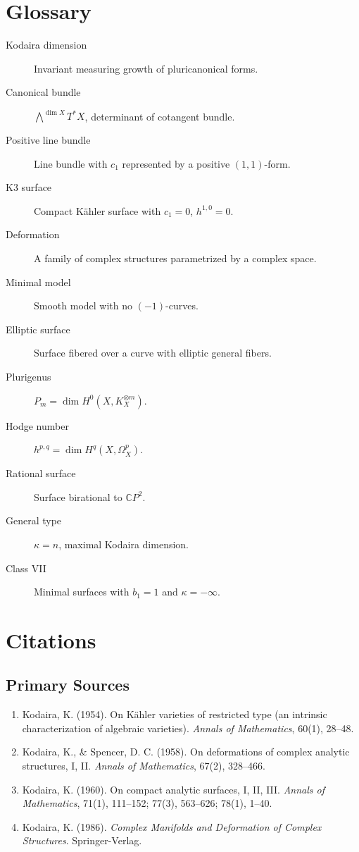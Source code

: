 \section*{Glossary}
\begin{description}
    \item[Kodaira dimension] Invariant measuring growth of pluricanonical forms.
    \item[Canonical bundle] $\bigwedge^{\dim X} T^*X$, determinant of cotangent bundle.
    \item[Positive line bundle] Line bundle with $c_1$ represented by a positive $(1,1)$-form.
    \item[K3 surface] Compact K\"{a}hler surface with $c_1 = 0$, $h^{1,0} = 0$.
    \item[Deformation] A family of complex structures parametrized by a complex space.
    \item[Minimal model] Smooth model with no $(-1)$-curves.
    \item[Elliptic surface] Surface fibered over a curve with elliptic general fibers.
    \item[Plurigenus] $P_m = \dim H^0(X, K_X^{\otimes m})$.
    \item[Hodge number] $h^{p,q} = \dim H^q(X, \Omega^p_X)$.
    \item[Rational surface] Surface birational to $\mathbb{C}P^2$.
    \item[General type] $\kappa = n$, maximal Kodaira dimension.
    \item[Class VII] Minimal surfaces with $b_1 = 1$ and $\kappa = -\infty$.
\end{description}

\section{Citations}

\subsection*{Primary Sources}
\begin{enumerate}
    \item Kodaira, K. (1954). On Kähler varieties of restricted type (an intrinsic characterization of algebraic varieties). \textit{Annals of Mathematics}, 60(1), 28--48.
    \item Kodaira, K., \& Spencer, D. C. (1958). On deformations of complex analytic structures, I, II. \textit{Annals of Mathematics}, 67(2), 328--466.
    \item Kodaira, K. (1960). On compact analytic surfaces, I, II, III. \textit{Annals of Mathematics}, 71(1), 111--152; 77(3), 563--626; 78(1), 1--40.
    \item Kodaira, K. (1986). \textit{Complex Manifolds and Deformation of Complex Structures}. Springer-Verlag.
\end{enumerate}

